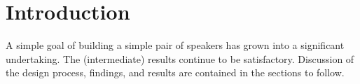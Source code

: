 \section{Introduction}
A simple goal of building a simple pair of speakers has grown into a significant undertaking. The (intermediate) results continue to be satisfactory. Discussion of the design process, findings, and results are contained in the sections to follow.\par